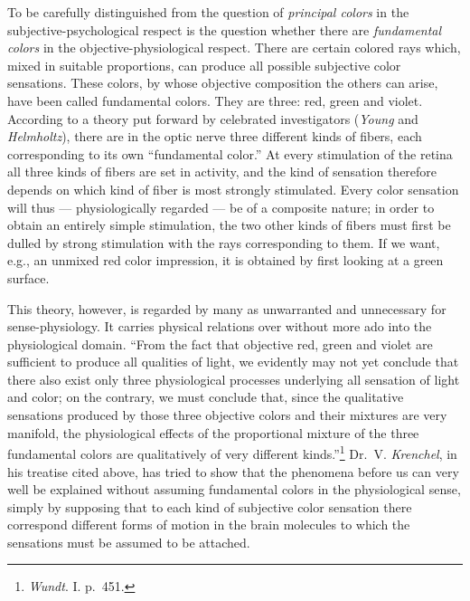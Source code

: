 \documentclass[12pt,a4paper]{book}
\newcommand{\opage}[1]{\marginnote{\footnotesize\textit{[#1]}}}
\begin{document}
To be carefully distinguished from the question of \emph{principal
colors} in the subjective-psychological respect is the question whether
there are \emph{fundamental colors} in the objective-physiological
respect. There are certain colored rays which, mixed in suitable
proportions, can produce all possible subjective color sensations. These
colors, by whose objective composition the others can arise, have been
called fundamental colors. They are three: red, green and violet.
According to a theory put forward by celebrated investigators
(\emph{Young} and \emph{Helmholtz}), there are in the optic nerve three
different kinds of fibers, each corresponding to its own ``fundamental
color.'' At every stimulation of the retina all three
\opage{124}kinds of fibers are set in activity, and the kind of sensation
therefore depends on which kind of fiber is most strongly stimulated.
Every color sensation will thus --- physiologically regarded --- be of a
composite nature; in order to obtain an entirely simple stimulation, the
two other kinds of fibers must first be dulled by strong stimulation
with the rays corresponding to them. If we want, e.g., an unmixed red
color impression, it is obtained by first looking at a green surface.

This theory, however, is regarded by many as unwarranted and unnecessary
for sense-physiology. It carries physical relations over without more
ado into the physiological domain. ``From the fact that objective red,
green and violet are sufficient to produce all qualities of light, we
evidently may not yet conclude that there also exist only three
physiological processes underlying all sensation of light and color; on
the contrary, we must conclude that, since the qualitative sensations
produced by those three objective colors and their mixtures are very
manifold, the physiological effects of the proportional mixture of the
three fundamental colors are qualitatively of very different
kinds.''\footnote{\emph{Wundt}. I. p.~451.} Dr.\ V. \emph{Krenchel}, in
his treatise cited above, has tried to show that the phenomena before us
can very well be explained without assuming fundamental colors in the
physiological sense, simply by supposing that to each kind of subjective
color sensation there correspond different forms of motion in the brain
molecules to which the sensations must be assumed to be attached.
\end{document}
